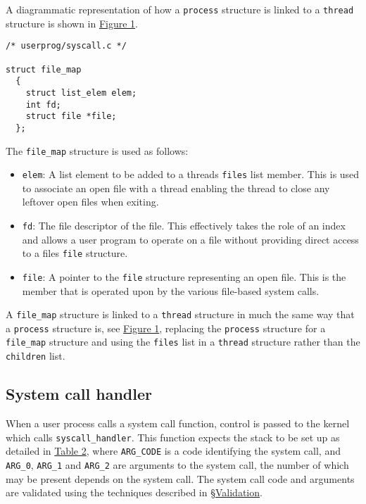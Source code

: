 \documentclass{article}
\begin{document}
A diagrammatic representation of how a \verb!process! structure is linked to a \verb!thread! structure is shown in \hyperref[fig:1]{Figure 1}.

\begin{verbatim}
/* userprog/syscall.c */

struct file_map
  {
    struct list_elem elem;
    int fd;
    struct file *file;
  };
\end{verbatim}

The \verb!file_map! structure is used as follows:

\begin{itemize}
    \item \verb!elem!: A list element to be added to a threads \verb!files! list member. This is used to associate an open file with a thread enabling the thread to close any leftover open files when exiting.

    \item \verb!fd!: The file descriptor of the file. This effectively takes the role of an index and allows a user program to operate on a file without providing direct access to a files \verb!file! structure.

    \item \verb!file!: A pointer to the \verb!file! structure representing an open file. This is the member that is operated upon by the various file-based system calls.
\end{itemize}

A \verb!file_map! structure is linked to a \verb!thread! structure in much the same way that a \verb!process! structure is, see \hyperref[fig:1]{Figure 1}, replacing the \verb!process! structure for a \verb!file_map! structure and using the \verb!files! list in a \verb!thread! structure rather than the \verb!children! list.

\subsection{System call handler}
\label{sec:system-call-handler}

When a user process calls a system call function, control is passed to the kernel which calls \verb!syscall_handler!. This function expects the stack to be set up as detailed in \hyperref[table:2]{Table 2}, where \verb!ARG_CODE! is a code identifying the system call, and \verb!ARG_0!, \verb!ARG_1! and \verb!ARG_2! are arguments to the system call, the number of which may be present depends on the system call. The system call code and arguments are validated using the techniques described in \hyperref[sec:validation]{\S Validation}.
\end{document}
